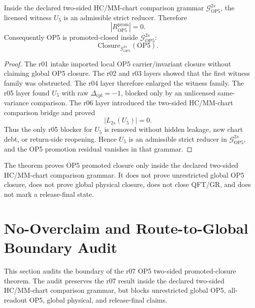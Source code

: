 \begin{theorem}
Inside the declared two-sided HC/MM-chart comparison grammar
\(\mathcal G_{\mathrm{OP5}}^{2s}\), the licensed witness \(U_5\) is an
admissible strict reducer.  Therefore
\[
    |R_{\mathrm{OP5}}^{\mathrm{prom}}|=0.
\]
Consequently OP5 is promoted-closed inside
\(\mathcal G_{\mathrm{OP5}}^{2s}\):
\[
    \mathrm{Closure}_{\mathcal G_{\mathrm{OP5}}^{2s}}(\mathrm{OP5}).
\]
\end{theorem}

\begin{proof}
The r01 intake imported local OP5 carrier/invariant closure without claiming
global OP5 closure.  The r02 and r03 layers showed that the first witness
family was obstructed.  The r04 layer therefore enlarged the witness family.
The r05 layer found \(U_5\) with raw \(\Delta_{\mathrm{cpl}}=-1\), blocked
only by an unlicensed same-variance comparison.  The r06 layer introduced the
two-sided HC/MM-chart comparison bridge and proved
\[
    |L_{2s}(U_5)|=0.
\]
Thus the only r05 blocker for \(U_5\) is removed without hidden leakage, new
chart debt, or return-side reopening.  Hence \(U_5\) is an admissible strict
reducer in \(\mathcal G_{\mathrm{OP5}}^{2s}\), and the OP5 promotion residual
vanishes in that grammar.
\end{proof}

\begin{remark}
The theorem proves OP5 promoted closure only inside the declared two-sided
HC/MM-chart comparison grammar.  It does not prove unrestricted global OP5
closure, does not prove global physical closure, does not close QFT/GR, and
does not mark a release-final state.
\end{remark}



\section{No-Overclaim and Route-to-Global Boundary Audit}
\label{sec:v450-r08-no-overclaim-route-to-global-boundary-audit}

This section audits the boundary of the r07 OP5 two-sided promoted-closure
theorem.  The audit preserves the r07 result inside the declared two-sided
HC/MM-chart comparison grammar, but blocks unrestricted global OP5, all-readout
OP5, global physical, and release-final claims.

